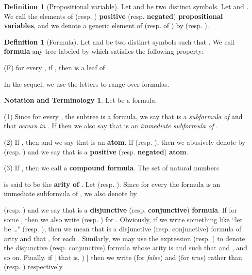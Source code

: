 \documentclass[copyright,creativecommons]{eptcs}
\theoremstyle{definition}
\newtheorem{Definition}[theorem]{Definition}
\newtheorem{notation}[theorem]{Notation and Terminology}{\bfseries}{}
\newcommand{\squishlist}{
 \begin{list}{}
  { \setlength{\itemsep}{0pt}
     \setlength{\parsep}{3pt}
     \setlength{\topsep}{3pt}
     \setlength{\partopsep}{0pt}
     \setlength{\leftmargin}{1em}
     \setlength{\labelwidth}{1.5em}
     \setlength{\labelsep}{0.5em} } }
\newcommand{\squishend}{
  \end{list}  }
\begin{document}
 \begin{Definition}[Propositional variable]
 Let  and  be two distinct symbols. Let  and .
  We call  the elements of  (resp. )  \textbf{positive} (resp. \textbf{negated}) \textbf{propositional
 variables}, and
 we denote a generic element  of  (resp.  of  ) by   (resp. ).
   \hfill\end{Definition}

\begin{Definition}[Formula] \label{formula}
 Let  and  be two distinct symbols
 such that .
We call  \textbf{formula}  any tree   labeled by  which satisfies the following property:
 \squishlist
\item[ (F)]  \qquad   for every , if   ,  then   is a leaf of .
\squishend
In the sequel, we use the letters  to range over formulas.
\hfill
 \end{Definition}





\begin{notation}
Let  be a formula.

(1) Since
for every , the  subtree
 is a formula, we say that
 is a \emph{subformula of}  and that  \emph{occurs in} . If
 then we also say that
 is an \emph{immediate subformula of} .

(2) If  ,  then 
and we say that  is an \textbf{atom}.
If   (resp. ),  then we abusively   denote  by  (resp. ) and we  say that  is  a \textbf{positive} (resp. \textbf{negated}) \textbf{atom}.

(3) If , then we call   a \textbf{compound formula}. The set of natural numbers
\squishlist
\item[] \centering{ \par}
\squishend
\noindent is said to be the \textbf{arity of}  .
Let  (resp. ). Since for every  the formula  is
an immediate subformula of , we also denote  by
  
(resp.  )
and we say that   is a
\textbf{disjunctive} (resp. \textbf{conjunctive}) \textbf{formula}.
If  for some ,
 then
we also write 
(resp. )
for .
Obviously, if we write  something like ``let  be   \ldots " (resp.
), then
we mean that  is a disjunctive (resp. conjunctive)
 formula of arity  and that , for each .
Similarly, we may use the expression  (resp. ) to denote the disjunctive (resp. conjunctive) formula
 whose arity is  and such that  and
 , and so on.
 Finally, if
 | that is, ) |
then we write  (for \emph{false}) and   (for \emph{true})
rather than  (resp. ) respectively.
 \hfill


\end{notation}
\end{document}

